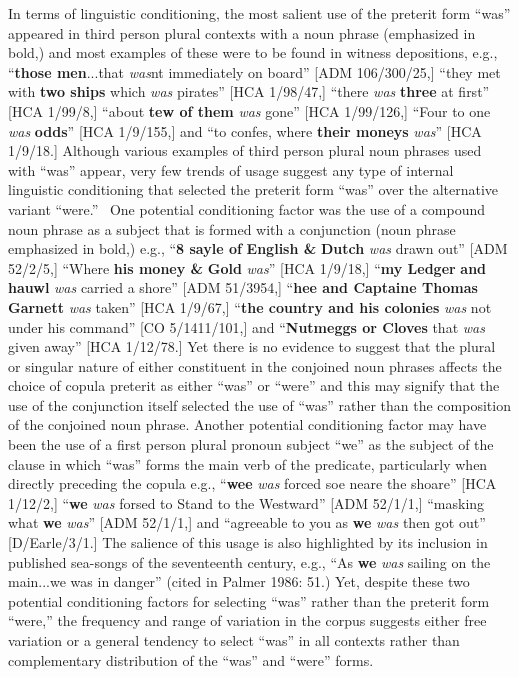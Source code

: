 \documentclass[12pt]{article}
\newenvironment{styleStandard}{\renewcommand\baselinestretch{1.0}\setlength\leftskip{0cm}\setlength\rightskip{0cm plus 1fil}\setlength\parindent{0cm}\setlength\parfillskip{0pt plus 1fil}\setlength\parskip{0in plus 1pt}\writerlistparindent\writerlistleftskip\leavevmode\normalfont\normalsize\writerlistlabel\ignorespaces}{\unskip\vspace{0in plus 1pt}\par}
\newcommand\writerlistleftskip{}
\newcommand\writerlistparindent{}
\newcommand\writerlistlabel{}
\begin{document}
\begin{styleStandard}
In terms of linguistic conditioning, the most salient use of the preterit form “was” appeared in third person plural contexts with a noun phrase (emphasized in bold,) and most examples of these were to be found in witness depositions, e.g., “\textbf{those men}...that \textit{was}n{\textquotesingle}t immediately on board” [ADM 106/300/25,] “they met with \textbf{two ships} which \textit{was} pirates” [HCA 1/98/47,] “there \textit{was} \textbf{three} at first” [HCA 1/99/8,] “about \textbf{tew of them} \textit{was} gone” [HCA 1/99/126,] “Four to one \textit{was} \textbf{odds}” [HCA 1/9/155,] and “to confes, where \textbf{their moneys} \textit{was}” [HCA 1/9/18.] Although various examples of third person plural noun phrases used with “was” appear, very few trends of usage suggest any type of internal linguistic conditioning that selected the preterit form “was” over the alternative variant “were.” \ One potential conditioning factor was the use of a compound noun phrase as a subject that is formed with a conjunction (noun phrase emphasized in bold,) e.g., “\textbf{8 sayle of} \textbf{English \&} \textbf{Dutch} \textit{was} drawn out” [ADM 52/2/5,] “Where \textbf{his money \&} \textbf{Gold} \textit{was}” [HCA 1/9/18,] “\textbf{my Ledger} \textbf{and} \textbf{hauwl} \textit{was} carried a shore” [ADM 51/3954,] “\textbf{hee and Captaine Thomas Garnett }\textit{was} taken” [HCA 1/9/67,] “\textbf{the country and his colonies} \textit{was} not under his command” [CO 5/1411/101,] and “\textbf{Nutmeggs or Cloves} that \textit{was} given away” [HCA 1/12/78.] Yet there is no evidence to suggest that the plural or singular nature of either constituent in the conjoined noun phrases affects the choice of copula preterit as either “was” or “were” and this may signify that the use of the conjunction itself selected the use of “was” rather than the composition of the conjoined noun phrase. Another potential conditioning factor may have been the use of a first person plural pronoun subject “we” as the subject of the clause in which “was” forms the main verb of the predicate, particularly when directly preceding the copula e.g., “\textbf{wee} \textit{was} forced soe neare the shoare” [HCA 1/12/2,] “\textbf{we} \textit{was} forsed to Stand to the Westward” [ADM 52/1/1,] “masking what \textbf{we} \textit{was}” [ADM 52/1/1,] and “agreeable to you as \textbf{we }\textit{was} then got out” [D/Earle/3/1.] The salience of this usage is also highlighted by its inclusion in published sea-songs of the seventeenth century, e.g., “As \textbf{we }\textit{was} sailing on the main...we was in danger” (cited in Palmer 1986: 51.) Yet, despite these two potential conditioning factors for selecting “was” rather than the preterit form “were,” the frequency and range of variation in the corpus suggests either free variation or a general tendency to select “was” in all contexts rather than complementary distribution of the “was” and “were” forms. 
\end{styleStandard}
\end{document}
